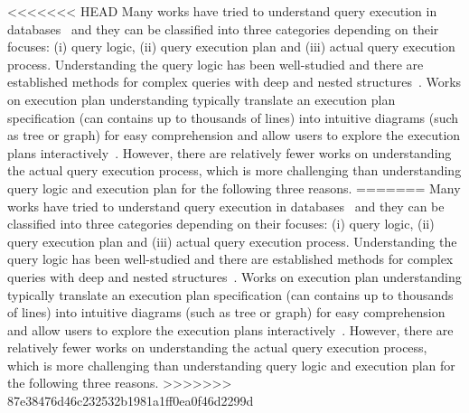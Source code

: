 

<<<<<<< HEAD
Many works have tried to understand query execution in databases~\cite{} and they can be classified into three categories depending on their focuses: (i) query logic, (ii) query execution plan and (iii) actual query execution process. Understanding the query logic has been well-studied and there are established methods for complex  queries with deep and nested structures~\cite{}. Works on execution plan understanding typically translate an execution plan specification (can contains up to thousands of lines) into intuitive diagrams (such as tree or graph) for easy comprehension and allow users to explore the execution plans interactively~\cite{}. However, there are relatively fewer works on understanding the actual query execution process, which is more challenging than understanding query logic and execution plan for the following three reasons.      
=======
Many works have tried to understand query execution in databases~\cite{koutrika2010explaining,gawade2012stethoscope,leventidis2020queryvis,danaparamita2011queryviz} and they can be classified into three categories depending on their focuses: (i) query logic, (ii) query execution plan and (iii) actual query execution process. Understanding the query logic has been well-studied and there are established methods for complex  queries with deep and nested structures~\cite{leventidis2020queryvis, danaparamita2011queryviz}. Works on execution plan understanding typically translate an execution plan specification (can contains up to thousands of lines) into intuitive diagrams (such as tree or graph) for easy comprehension and allow users to explore the execution plans interactively~\cite{simitsis2014vqa,moritz2015perfopticon}. However, there are relatively fewer works on understanding the actual query execution process, which is more challenging than understanding query logic and execution plan for the following three reasons.      
>>>>>>> 87e38476d46c232532b1981a1ff0ea0f46d2299d


